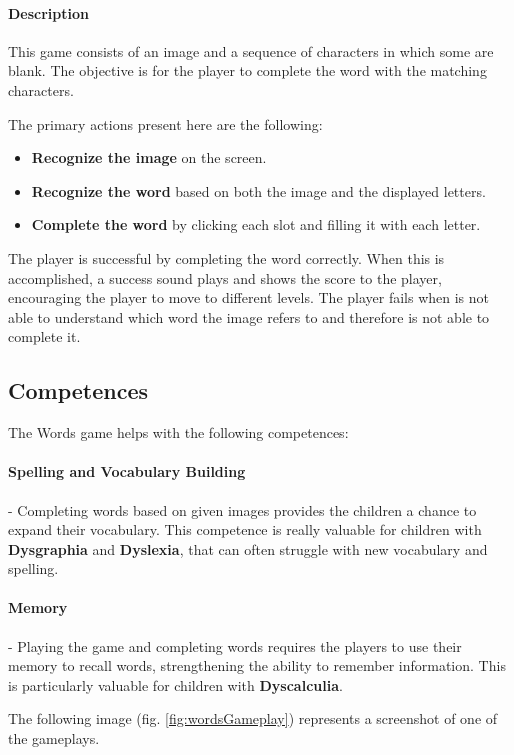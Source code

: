 \paragraph{Description}
This game consists of an image and a sequence of characters in which some are blank. The objective is for the player to complete the word with the matching characters.

The primary actions present here are the following:

\begin{itemize}
    \item \textbf{Recognize the image} on the screen.
    \item \textbf{Recognize the word} based on both the image and the displayed letters.
    \item \textbf{Complete the word} by clicking each slot and filling it with each letter.
\end{itemize}

The player is successful by completing the word correctly. When this is accomplished, a success sound plays and shows the score to the player, encouraging the player to move to different levels.
The player fails when is not able to understand which word the image refers to and therefore is not able to complete it.

\subsection{Competences}
The Words game helps with the following competences:

\paragraph{Spelling and Vocabulary Building}- Completing words based on given images provides the children a chance to expand their vocabulary. This competence is really valuable for children with \textbf{Dysgraphia} and \textbf{Dyslexia}, that can often struggle with new vocabulary and spelling.

\paragraph{Memory}- Playing the game and completing words requires the players to use their memory to recall words, strengthening the ability to remember information. This is particularly valuable for children with \textbf{Dyscalculia}.

The following image (fig. \ref{fig:wordsGameplay}) represents a screenshot of one of the gameplays.

